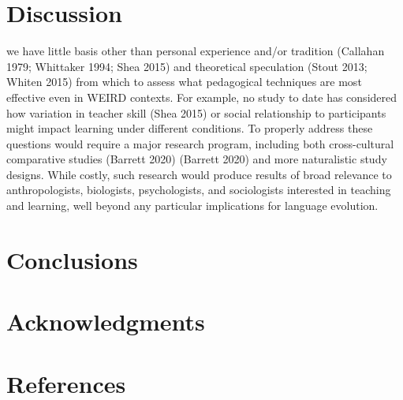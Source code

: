 \documentclass[smallextended]{svjour3}       %
\begin{document}
\hypertarget{discussion}{%
\section{\texorpdfstring{\textbf{Discussion}}{Discussion}}\label{discussion}}

we have little basis other than personal experience and/or tradition
(Callahan 1979; Whittaker 1994; Shea 2015) and theoretical speculation
(Stout 2013; Whiten 2015) from which to assess what pedagogical
techniques are most effective even in WEIRD contexts. For example, no
study to date has considered how variation in teacher skill (Shea 2015)
or social relationship to participants might impact learning under
different conditions. To properly address these questions would require
a major research program, including both cross-cultural comparative
studies (Barrett 2020) (Barrett 2020) and more naturalistic study
designs. While costly, such research would produce results of broad
relevance to anthropologists, biologists, psychologists, and
sociologists interested in teaching and learning, well beyond any
particular implications for language evolution.

\hypertarget{conclusions}{%
\section{\texorpdfstring{\textbf{Conclusions}}{Conclusions}}\label{conclusions}}

\hypertarget{acknowledgments}{%
\section{\texorpdfstring{\textbf{Acknowledgments}}{Acknowledgments}}\label{acknowledgments}}

\hypertarget{references}{%
\section*{\texorpdfstring{\textbf{References}}{References}}\label{references}}
\end{document}
